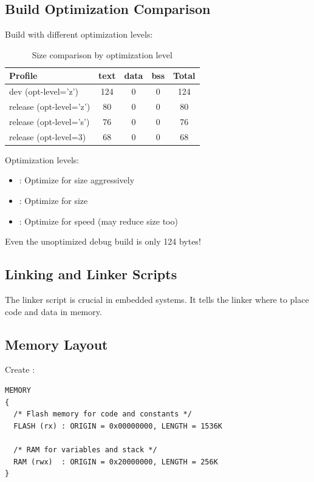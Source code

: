 \subsection{Build Optimization Comparison}
\label{sec:optimization-comparsion}

Build with different optimization levels:

\begin{table}[H]
    \centering
    \begin{tabular}{l c c c c}
        \toprule
        \textbf{Profile} & \textbf{text} & \textbf{data} & \textbf{bss} & \textbf{Total} \\
        \midrule
        dev (opt-level='z') & 124 & 0 & 0 & 124 \\
        release (opt-level='z') & 80 & 0 & 0 & 80 \\
        release (opt-level='s') & 76 & 0 & 0 & 76 \\
        release (opt-level=3) & 68 & 0 & 0 & 68 \\
        \bottomrule
    \end{tabular}
    \caption{Size comparison by optimization level}
    \label{tab:optimization-size}
\end{table}

Optimization levels:
\begin{itemize}
    \item {}: Optimize for size aggressively
    \item {}: Optimize for size
    \item {}: Optimize for speed (may reduce size too)
\end{itemize}

Even the unoptimized debug build is only 124 bytes!

\subsection{Linking and Linker Scripts}
\label{sec:linking}

The linker script is crucial in embedded systems. It tells the linker where to place code and data in memory.
\subsection{Memory Layout}
Create :
\begin{verbatim}
MEMORY
{
  /* Flash memory for code and constants */
  FLASH (rx) : ORIGIN = 0x00000000, LENGTH = 1536K

  /* RAM for variables and stack */
  RAM (rwx)  : ORIGIN = 0x20000000, LENGTH = 256K
}
\end{verbatim}

